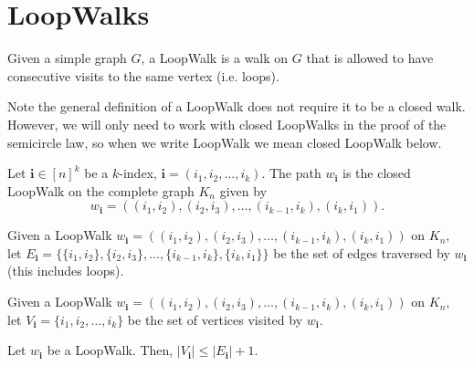 \chapter{LoopWalks}


\begin{definition}
  \label{def:loop_walk}
  \leanok
  Given a simple graph $G$, a LoopWalk is a walk on $G$ that is allowed to have consecutive visits
  to the same vertex (i.e. loops).
\end{definition}


Note the general definition of a LoopWalk does not require it to be a closed walk. However, we will
only need to work with closed LoopWalks in the proof of the semicircle law, so when we write
LoopWalk we mean closed LoopWalk below.


\begin{definition}
  \label{def:graph_walk_multi_index}
  Let $\mathbf{i} \in[n]^k$ be a $k$-index, $\mathbf{i}=\left(i_1, i_2, \ldots, i_k\right)$. The path
  $w_{\mathbf{i}}$ is the closed LoopWalk on the complete graph $K_n$ given by
  $$
  w_\mathbf{i}=((i_1, i_2),(i_2, i_3), \ldots,(i_{k-1}, i_k),(i_k, i_1)).
  $$
\end{definition}


\begin{definition}
  \label{def:graph_walk_edges}
  \leanok
  Given a LoopWalk $w_\mathbf{i}=((i_1, i_2),(i_2, i_3), \ldots,(i_{k-1}, i_k),(i_k, i_1))$ on
  $K_n$, let
  $E_\mathbf{i}= \{\{i_1, i_2\},\{i_2, i_3\}, \ldots,\{i_{k-1}, i_k\}, \{i_k, i_1\}\}$ be the set
  of edges traversed by $w_{\mathbf{i}}$ (this includes loops).
\end{definition}


\begin{definition}
  \label{def:graph_walk_vertices}
  \leanok
  Given a LoopWalk $w_\mathbf{i}=((i_1, i_2),(i_2, i_3), \ldots,(i_{k-1}, i_k),(i_k, i_1))$ on
  $K_n$, let $V_\mathbf{i}= \{i_1, i_2, \dots, i_k\}$ be the set
  of vertices visited by $w_{\mathbf{i}}$.
\end{definition}



\begin{proposition}%
  \label{prop:vertex_edge_inequality}
  Let $w_{\mathbf{i}}$ be a LoopWalk. Then,
  $|V_{\mathbf{i}}|\le |E_{\mathbf{i}}|+1$.
\end{proposition}


